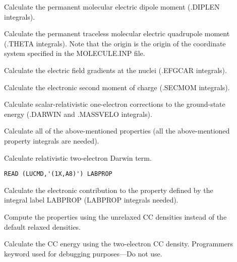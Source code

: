 \begin{description}
\item[] 
        Calculate the permanent molecular electric dipole moment
        (.DIPLEN integrals).
%
\item[] 
        Calculate the permanent traceless molecular electric
        quadrupole moment (.THETA integrals). Note that the
        origin is the origin of the coordinate system specified
        in the MOLECULE.INP file.
%
\item[] 
        Calculate the electric field gradients at the nuclei
        (.EFGCAR integrals).
%
\item[] 
        Calculate the electronic second moment of charge
        (.SECMOM integrals).
%
\item[] 
        Calculate scalar-relativistic one-electron
        corrections to the ground-state
        energy (.DARWIN and .MASSVELO integrals).
%
\item[] 
        Calculate all of the above-mentioned properties (all the
        above-mentioned property integrals are needed).
%
\item[] 
        Calculate relativistic two-electron Darwin term.
%
\item[] 
\begin{verbatim}
READ (LUCMD,'(1X,A8)') LABPROP
\end{verbatim}
        Calculate the electronic contribution to the property defined
        by the integral label LABPROP (LABPROP integrals needed).
%
\item[] 
        Compute the properties using the unrelaxed CC densities instead
        of the default relaxed densities.
%
\item[] 
        Calculate the CC energy using the two-electron CC density.
        Programmers keyword used for debugging purposes---Do not use.
%
\end{description}
